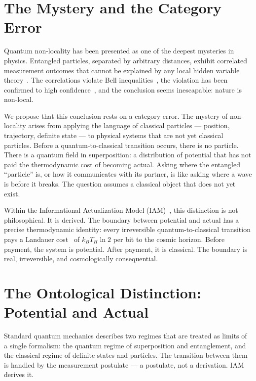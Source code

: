 \documentclass[12pt,a4paper]{article}
\begin{document}
\section{The Mystery and the Category Error}
\label{sec:intro}

Quantum non-locality has been presented as one of the deepest mysteries
in physics. Entangled particles, separated by arbitrary distances,
exhibit correlated measurement outcomes that cannot be explained by any
local hidden variable theory~\citep{Bell1964}. The correlations violate
Bell inequalities~\citep{Aspect1982}, the violation has been confirmed to
high confidence~\citep{Hensen2015}, and the conclusion seems inescapable:
nature is non-local.

We propose that this conclusion rests on a category error. The mystery of
non-locality arises from applying the language of classical particles ---
position, trajectory, definite state --- to physical systems that are not
yet classical particles. Before a quantum-to-classical transition occurs,
there is no particle. There is a quantum field in superposition: a
distribution of potential that has not paid the thermodynamic cost of
becoming actual. Asking where the entangled ``particle'' is, or how it
communicates with its partner, is like asking where a wave is before it
breaks. The question assumes a classical object that does not yet exist.

Within the Informational Actualization Model
(IAM)~\citep{IAM_theory,IAM_obs}, this distinction is not philosophical.
It is derived. The boundary between potential and actual has a precise
thermodynamic identity: every irreversible quantum-to-classical transition
pays a Landauer cost~\citep{Landauer1961} of $k_B T_H \ln 2$ per bit to
the cosmic horizon. Before payment, the system is potential. After
payment, it is classical. The boundary is real, irreversible, and
cosmologically consequential.

\section{The Ontological Distinction: Potential and Actual}
\label{sec:ontology}

Standard quantum mechanics describes two regimes that are treated as
limits of a single formalism: the quantum regime of superposition and
entanglement, and the classical regime of definite states and particles.
The transition between them is handled by the measurement postulate ---
a postulate, not a derivation. IAM derives it.
\end{document}
